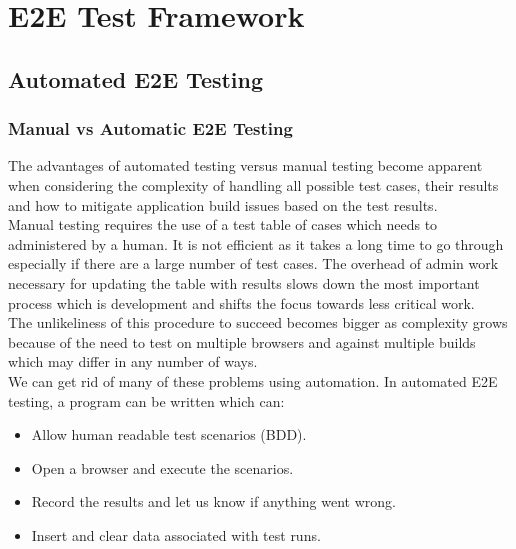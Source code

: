 \chapter{E2E Test Framework}
\label{chap:e2e-test-framework}

\section{Automated E2E Testing}
\label{sec:automated-e2e-testing}

\subsection{Manual vs Automatic E2E Testing}
\label{sec:manual-vs-automatic-e2e-testing}

The advantages of automated testing versus manual testing become apparent when considering the complexity of handling all possible test cases, their results and how to mitigate application build issues based on the test results.
\\

Manual testing requires the use of a test table of cases which needs to administered by a human. It is not efficient as it takes a long time to go through especially if there are a large number of test cases. The overhead of admin work necessary for updating the table with results slows down the most important process which is development and shifts the focus towards less critical work.
\\

The unlikeliness of this procedure to succeed becomes bigger as complexity grows because of the need to test on multiple browsers and against multiple builds which may differ in any number of ways.
\\

We can get rid of many of these problems using automation. In automated E2E testing, a program can be written which can:

\begin{itemize}
\item Allow human readable test scenarios (BDD).
\item Open a browser and execute the scenarios.
\item Record the results and let us know if anything went wrong.
\item Insert and clear data associated with test runs.
\end{itemize}


